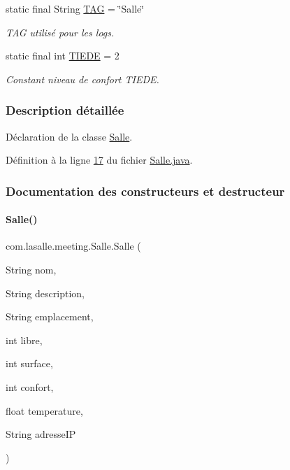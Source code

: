 \begin{DoxyCompactItemize}
static final String \hyperlink{classcom_1_1lasalle_1_1meeting_1_1_salle_aecf7e402dafb939f8ac2f2873f66af25}{T\+AG} = \char`\"{}Salle\char`\"{}
\begin{DoxyCompactList}\small\item\em T\+AG utilisé pour les logs. \end{DoxyCompactList}\item 
static final int \hyperlink{classcom_1_1lasalle_1_1meeting_1_1_salle_ab6fdb3566901998a91c1cd17f589f607}{T\+I\+E\+DE} = 2
\begin{DoxyCompactList}\small\item\em Constant niveau de confort T\+I\+E\+DE. \end{DoxyCompactList}\end{DoxyCompactItemize}


\subsubsection{Description détaillée}
Déclaration de la classe \hyperlink{classcom_1_1lasalle_1_1meeting_1_1_salle}{Salle}. 

Définition à la ligne \hyperlink{_salle_8java_source_l00017}{17} du fichier \hyperlink{_salle_8java_source}{Salle.\+java}.



\subsubsection{Documentation des constructeurs et destructeur}
\mbox{\label{classcom_1_1lasalle_1_1meeting_1_1_salle_aa97680026b36fa9e23e8c5c164b8326d}} 
\paragraph{\texorpdfstring{Salle()}{Salle()}}
{\footnotesize\ttfamily com.\+lasalle.\+meeting.\+Salle.\+Salle (\begin{DoxyParamCaption}\item[{String}]{nom,  }\item[{String}]{description,  }\item[{String}]{emplacement,  }\item[{int}]{libre,  }\item[{int}]{surface,  }\item[{int}]{confort,  }\item[{float}]{temperature,  }\item[{String}]{adresse\+IP }\end{DoxyParamCaption})}




